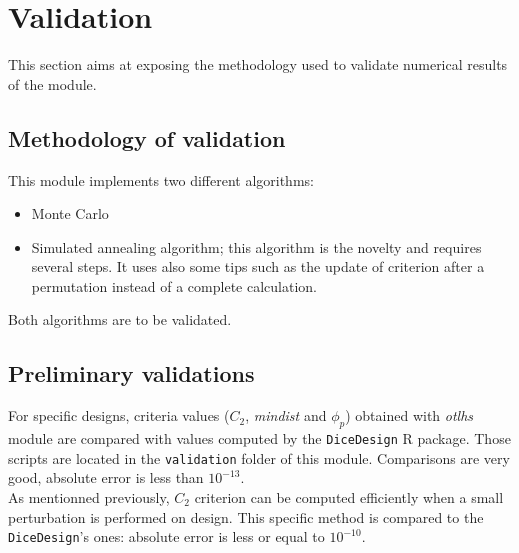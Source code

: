 %


\section{Validation}

This section aims at exposing the methodology used to validate numerical results of the module.

\subsection{Methodology of validation}

This module implements two different algorithms:
\begin{itemize}
\item Monte Carlo
\item Simulated annealing algorithm; this algorithm is the novelty and requires several steps.
It uses also some tips such as the update of criterion after a permutation instead of a complete calculation.
\end{itemize}

Both algorithms are to be validated.

\subsection{Preliminary validations}
For specific designs, criteria values ($C_2$, \textit{mindist} and $\phi_{p}$) obtained with \textit{otlhs} module are compared with values computed by the \texttt{DiceDesign} R package.
Those scripts are located in the \texttt{validation} folder of this module.  Comparisons are very good, absolute error is less than $10^{-13}$. \\

As mentionned previously, $C_2$ criterion can be computed efficiently when a small perturbation is performed on design.
This specific method is compared to the \texttt{DiceDesign}'s ones: absolute error is less or equal to $10^{-10}$.\\

